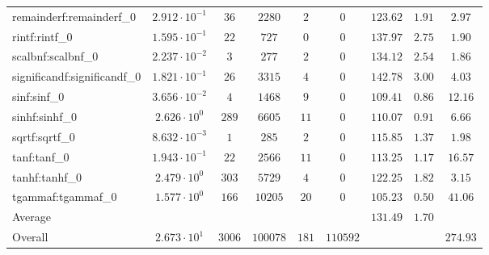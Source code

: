 \begin{tabular}{|l|c|c|c|c|c|c|c|c|}
remainderf:remainderf\_0     & $ 2.912 \cdot 10^{-1} $ & $ 36     $ & $ 2280   $ & $ 2   $ & $ 0      $ & $ 123.62      $ & $ 1.91    $ & $ 2.97    $ \\
rintf:rintf\_0               & $ 1.595 \cdot 10^{-1} $ & $ 22     $ & $ 727    $ & $ 0   $ & $ 0      $ & $ 137.97      $ & $ 2.75    $ & $ 1.90    $ \\
scalbnf:scalbnf\_0           & $ 2.237 \cdot 10^{-2} $ & $ 3      $ & $ 277    $ & $ 2   $ & $ 0      $ & $ 134.12      $ & $ 2.54    $ & $ 1.86    $ \\
significandf:significandf\_0 & $ 1.821 \cdot 10^{-1} $ & $ 26     $ & $ 3315   $ & $ 4   $ & $ 0      $ & $ 142.78      $ & $ 3.00    $ & $ 4.03    $ \\
sinf:sinf\_0                 & $ 3.656 \cdot 10^{-2} $ & $ 4      $ & $ 1468   $ & $ 9   $ & $ 0      $ & $ 109.41      $ & $ 0.86    $ & $ 12.16   $ \\
sinhf:sinhf\_0               & $ 2.626 \cdot 10^{0}  $ & $ 289    $ & $ 6605   $ & $ 11  $ & $ 0      $ & $ 110.07      $ & $ 0.91    $ & $ 6.66    $ \\
sqrtf:sqrtf\_0               & $ 8.632 \cdot 10^{-3} $ & $ 1      $ & $ 285    $ & $ 2   $ & $ 0      $ & $ 115.85      $ & $ 1.37    $ & $ 1.98    $ \\
tanf:tanf\_0                 & $ 1.943 \cdot 10^{-1} $ & $ 22     $ & $ 2566   $ & $ 11  $ & $ 0      $ & $ 113.25      $ & $ 1.17    $ & $ 16.57   $ \\
tanhf:tanhf\_0               & $ 2.479 \cdot 10^{0}  $ & $ 303    $ & $ 5729   $ & $ 4   $ & $ 0      $ & $ 122.25      $ & $ 1.82    $ & $ 3.15    $ \\
tgammaf:tgammaf\_0           & $ 1.577 \cdot 10^{0}  $ & $ 166    $ & $ 10205  $ & $ 20  $ & $ 0      $ & $ 105.23      $ & $ 0.50    $ & $ 41.06   $ \\
\hline
Average                      & $                     $ & $        $ & $        $ & $     $ & $        $ & $ 131.49      $ & $ 1.70    $ & $         $ \\
\hline
Overall                      & $ 2.673 \cdot 10^{1}  $ & $ 3006   $ & $ 100078 $ & $ 181 $ & $ 110592 $ & $             $ & $         $ & $ 274.93  $ \\
\hline
\end{tabular}
